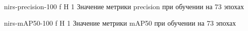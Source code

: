 {nirs-precision-100} %
{f} %
{H} %
{1\textwidth} %
{Значение метрики precision при обучении на 73 эпохах} %


{nirs-mAP50-100} %
{f} %
{H} %
{1\textwidth} %
{Значение метрики mAP50 при обучении на 73 эпохах} %






